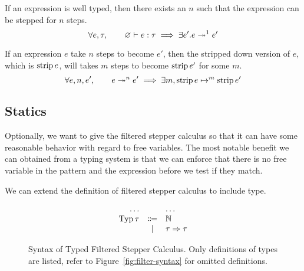 \begin{theorem}[Progress]\label{thm:progress}
  If an expression is well typed, then there exists an \(n\) such that the expression can be stepped for \(n\) steps.
  \[
    \forall e, \tau, \qquad
    \TypeEntails{\varnothing}{e}{\tau} \implies \exists e' . \Step{e}{e'}{1}
  \]
\end{theorem}

\begin{theorem}[Simulation]\label{thm:simulation}
  If an expression \(e\) take \(n\) steps to become \(e'\), then the stripped down version of \(e\), which is \(\Strip{e}\), will takes \(m\) steps to become \(\Strip{e'}\) for some \(m\).
  \[
    \forall e, n, e', \qquad
    \Step{e}{e'}{n} \implies \exists m, \JustStep{\Strip{e}}{\Strip{e'}}{m}
  \]
\end{theorem}

\subsection{Statics}

Optionally, we want to give the filtered stepper calculus so that it can have some reasonable behavior with regard to free variables. The most notable benefit we can obtained from a typing system is that we can enforce that there is no free variable in the pattern and the expression before we test if they match.

We can extend the definition of filtered stepper calculus to include type.
\begin{figure}[h]
  \begin{equation*}
    \begin{array}{rcl}
      \ldots       &         & \ldots \\
      \DefTyp \tau &\Coloneqq& \Natural \\
                   &\mid     & \Arrow{\tau}{\tau}
    \end{array}
  \end{equation*}
  \caption{Syntax of Typed Filtered Stepper Calculus. Only definitions of types are listed, refer to Figure~\ref{fig:filter-syntax} for omitted definitions.}
  \label{fig:typed-filter-syntax}
\end{figure}

